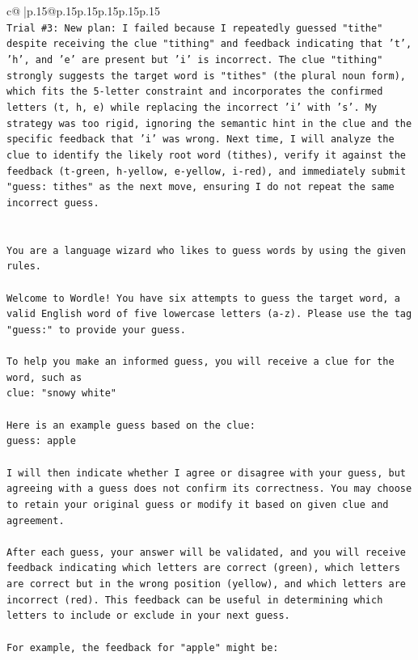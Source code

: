 \documentclass{article}
\begin{document}
{\begin{supertabular}{c@{$\;$}|p{.15\linewidth}@{}p{.15\linewidth}p{.15\linewidth}p{.15\linewidth}p{.15\linewidth}p{.15\linewidth}}
{{{\\ 
\texttt{Trial \#3: New plan: I failed because I repeatedly guessed "tithe" despite receiving the clue "tithing" and feedback indicating that 't', 'h', and 'e' are present but 'i' is incorrect. The clue "tithing" strongly suggests the target word is "tithes" (the plural noun form), which fits the 5{-}letter constraint and incorporates the confirmed letters (t, h, e) while replacing the incorrect 'i' with 's'. My strategy was too rigid, ignoring the semantic hint in the clue and the specific feedback that 'i' was wrong. Next time, I will analyze the clue to identify the likely root word (tithes), verify it against the feedback (t{-}green, h{-}yellow, e{-}yellow, i{-}red), and immediately submit "guess: tithes" as the next move, ensuring I do not repeat the same incorrect guess.} \\
\\ 
\\ 
\texttt{You are a language wizard who likes to guess words by using the given rules.} \\
\\ 
\texttt{Welcome to Wordle! You have six attempts to guess the target word, a valid English word of five lowercase letters (a{-}z). Please use the tag "guess:" to provide your guess.} \\
\\ 
\texttt{To help you make an informed guess, you will receive a clue for the word, such as} \\
\texttt{clue: "snowy white"} \\
\\ 
\texttt{Here is an example guess based on the clue: } \\
\texttt{guess: apple} \\
\\ 
\texttt{I will then indicate whether I agree or disagree with your guess, but agreeing with a guess does not confirm its correctness. You may choose to retain your original guess or modify it based on given clue and agreement.} \\
\\ 
\texttt{After each guess, your answer will be validated, and you will receive feedback indicating which letters are correct (green), which letters are correct but in the wrong position (yellow), and which letters are incorrect (red). This feedback can be useful in determining which letters to include or exclude in your next guess.} \\
\\ 
\texttt{For example, the feedback for "apple" might be:} \\
}}}
\end{supertabular}}
\end{document}
